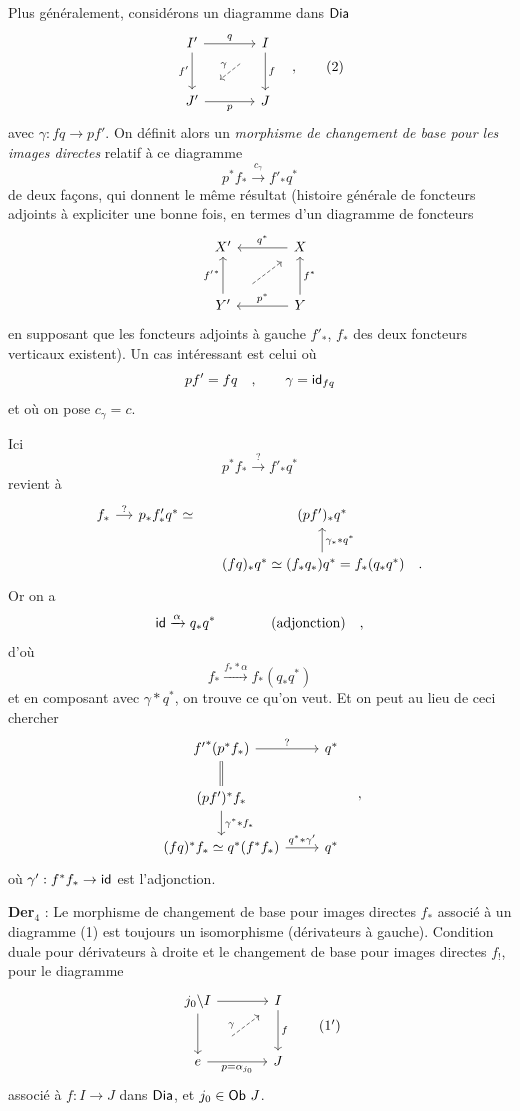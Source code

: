 Plus généralement, considérons un diagramme dans $\mathsf{Dia}$
\[
\begin{tikzcd}[row sep=large, column sep=large]
I' \arrow[r, "q"] \arrow[d, "f'"'] & I \arrow[d, "f"] \\
J' \arrow[r, "p"'] & J
\arrow[from=1-2, to=2-1, dashed, shorten <=14pt, shorten >=14pt, "\gamma"']
\end{tikzcd}
\quad ,
\tag*{(2)}
\]
avec $\gamma : fq \to pf'$. On définit alors un \textit{morphisme de changement de base pour les images directes} relatif à ce diagramme
\[ p^* f_* \xrightarrow{c_\gamma} f'_* q^* \]
de deux façons, qui donnent le même résultat (histoire générale de foncteurs adjoints à expliciter une bonne fois, en termes d'un diagramme de foncteurs
\[
\begin{tikzcd}[row sep=large, column sep=large]
X' & X \arrow[l, "q^*"'] \\
Y' \arrow[u, "{f'}^*"] & Y \arrow[l, "p^*"'] \arrow[u, "f^*"']
\arrow[from=2-1, to=1-2, dashed, shorten <=14pt, shorten >=6pt]
\end{tikzcd}
\]
en supposant que les foncteurs adjoints à gauche $f'_*$, $f_*$ des deux foncteurs verticaux existent). Un cas intéressant est celui où
\[ pf' = fq \quad , \qquad \gamma = \mathsf{id}_{fq} \]
et où on pose $c_\gamma = c$.

Ici
\[ p^* f_* \xrightarrow{?} f'_* q^* \]
revient à
\[
\begin{tikzcd}[column sep=small]
f_* \arrow[r, "?"] & p_* f'_* q^* \simeq & (pf')_* q^* \\
 & & (fq)_* q^* \simeq (f_* q_*) q^* = f_*(q_* q^*) \quad . \arrow[u, "\gamma_* * q^*"']
\end{tikzcd}
\]
Or on a
\[ \mathsf{id} \xrightarrow{\alpha} q_* q^* \qquad\qquad \text{(adjonction)} \quad , \]
d'où
\[ f_* \xrightarrow{f_* * \alpha} f_*(q_* q^*) \]
et en composant avec $\gamma * q^*$, on trouve ce qu'on veut. Et on peut au lieu de ceci chercher
\[
\begin{tikzcd}
{f'}^*(p^* f_*) \arrow[r, "?"] \arrow[d, equal] & q^* \\
(pf')^* f_* \arrow[d, "\gamma^* * f_*"] & \\
(fq)^* f_* \simeq q^*(f^* f_*) \arrow[r, "q^* * \gamma'"] & q^*
\end{tikzcd}
\quad ,
\]
où $\gamma' : f^* f_* \to \mathsf{id}$ est l'adjonction.

\textbf{Der}$_4$ : Le morphisme de changement de base pour images directes $f_*$ associé à un diagramme (1) est toujours un isomorphisme (dérivateurs à gauche). Condition duale pour dérivateurs à droite et le changement de base pour images directes $f_!$, pour le diagramme
\[
\begin{tikzcd}[row sep=large, column sep=large]
j_0 \backslash I \arrow[r] \arrow[d] & I \arrow[d, "f"] \\
e \arrow[r, "p = \alpha_{j_0}"'] & J
\arrow[from=2-1, to=1-2, dashed, shorten <=22pt, shorten >=8pt, "\gamma"]
\end{tikzcd}
\tag*{(1$'$)}
\]
associé à $f : I \to J$ dans $\mathsf{Dia}$, et $j_0 \in \mathsf{Ob}\ J$.

